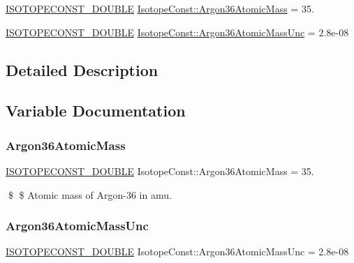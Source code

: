 \begin{DoxyCompactItemize}
\item 
\mbox{\hyperlink{group___isotope_const-_macros_ga8f45a7272ce02c0b4c65c44636ed719a}{I\+S\+O\+T\+O\+P\+E\+C\+O\+N\+S\+T\+\_\+\+D\+O\+U\+B\+LE}} \mbox{\hyperlink{group___isotope_const-_argon-_ar36_gaade6689835ef88ce9a96d735b98f5759}{Isotope\+Const\+::\+Argon36\+Atomic\+Mass}} = 35.
\item 
\mbox{\hyperlink{group___isotope_const-_macros_ga8f45a7272ce02c0b4c65c44636ed719a}{I\+S\+O\+T\+O\+P\+E\+C\+O\+N\+S\+T\+\_\+\+D\+O\+U\+B\+LE}} \mbox{\hyperlink{group___isotope_const-_argon-_ar36_gaa2312b31129630def76e575b5459082a}{Isotope\+Const\+::\+Argon36\+Atomic\+Mass\+Unc}} = 2.\+8e-\/08
\end{DoxyCompactItemize}


\subsection{Detailed Description}


\subsection{Variable Documentation}
\mbox{\label{group___isotope_const-_argon-_ar36_gaade6689835ef88ce9a96d735b98f5759}} 
\subsubsection{\texorpdfstring{Argon36\+Atomic\+Mass}{Argon36AtomicMass}}
{\footnotesize\ttfamily \mbox{\hyperlink{group___isotope_const-_macros_ga8f45a7272ce02c0b4c65c44636ed719a}{I\+S\+O\+T\+O\+P\+E\+C\+O\+N\+S\+T\+\_\+\+D\+O\+U\+B\+LE}} Isotope\+Const\+::\+Argon36\+Atomic\+Mass = 35.}

\$ \$ Atomic mass of Argon-\/36 in amu. \mbox{\label{group___isotope_const-_argon-_ar36_gaa2312b31129630def76e575b5459082a}} 
\subsubsection{\texorpdfstring{Argon36\+Atomic\+Mass\+Unc}{Argon36AtomicMassUnc}}
{\footnotesize\ttfamily \mbox{\hyperlink{group___isotope_const-_macros_ga8f45a7272ce02c0b4c65c44636ed719a}{I\+S\+O\+T\+O\+P\+E\+C\+O\+N\+S\+T\+\_\+\+D\+O\+U\+B\+LE}} Isotope\+Const\+::\+Argon36\+Atomic\+Mass\+Unc = 2.\+8e-\/08}

